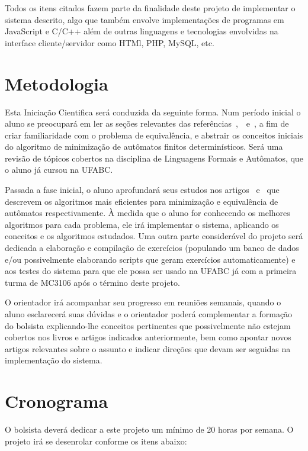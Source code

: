 \documentclass[
	12pt,				%
	openany,
	oneside,
	a4paper,			%
	english,			%
	brazil,				%
	]{abntex2}
\begin{document}
Todos os itens citados fazem parte da finalidade deste projeto de implementar o sistema descrito, algo que também envolve implementações de programas em JavaScript e C/C++ além de outras linguagens e tecnologias envolvidas na interface cliente/servidor como HTMl, PHP, MySQL, etc.

\chapter{Metodologia}

Esta Iniciação Cientifica será conduzida da seguinte forma. Num período inicial o aluno se preocupará em ler as seções relevantes das referências~\cite{sipser},~\cite{ullman}~e~\cite{linz}, a fim de criar familiaridade com o problema de equivalência, e abstrair os conceitos iniciais do algoritmo de minimização de autômatos finitos determinísticos. Será uma revisão de tópicos cobertos na disciplina de Linguagens Formais e Autômatos, que o aluno já cursou na UFABC.   

Passada a fase inicial, o aluno aprofundará seus estudos nos artigos~\cite{hopcroft} e~\cite{hopcroft_karp} que descrevem os algoritmos mais eficientes para minimização e equivalência de autômatos respectivamente.  À medida que o aluno for conhecendo os melhores algoritmos para cada problema, ele irá implementar o sistema, aplicando os conceitos e os algoritmos estudados. Uma outra parte considerável do projeto será dedicada a elaboração e compilação de exercícios (populando um banco de dados e/ou possivelmente elaborando scripts que geram exercícios automaticamente) e aos testes do sistema para que ele possa ser usado na UFABC já com a primeira turma de MC3106 após o término deste projeto.  

O orientador irá acompanhar seu progresso em reuniões semanais, quando o aluno esclarecerá suas dúvidas e o orientador poderá complementar a formação do bolsista explicando-lhe conceitos pertinentes que possivelmente não estejam cobertos nos livros e artigos indicados anteriormente, bem como apontar novos artigos relevantes sobre o assunto e indicar direções que devam ser seguidas na implementação do sistema.  



\chapter{Cronograma}

O bolsista deverá dedicar a este projeto um mínimo de 20 horas por semana. O projeto irá se desenrolar conforme os itens abaixo:  
\end{document}
